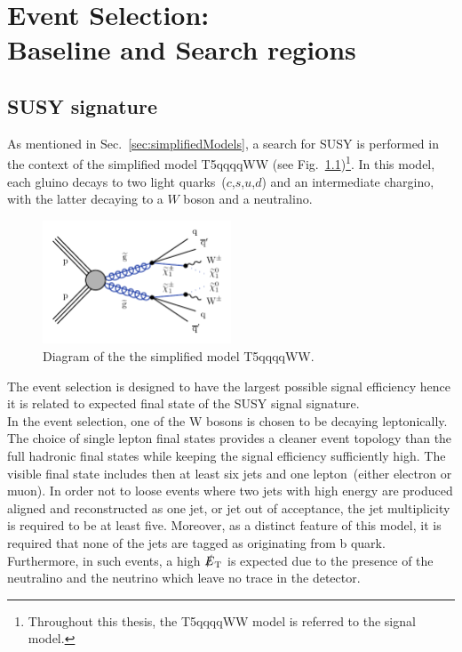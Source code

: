\chapter{Event Selection:\\Baseline and Search regions}
\label{Chap:eventSel}
\section{SUSY signature}
\label{signalDef}
As mentioned in Sec.~\ref{sec:simplifiedModels}, a search for SUSY is performed in the context of the simplified model T5qqqqWW (see Fig.~\ref{fig:T5qqqqWW})\footnote{Throughout this thesis, the T5qqqqWW model is referred to the signal model.}. In this model, each gluino decays to two light quarks~($c$,$s$,$u$,$d$) and an intermediate chargino, with the latter decaying to a $W$ boson and a neutralino.\\
\begin{figure}[!hb]
  \includegraphics[width=0.5\textwidth]{Plots/feyndiagrams/T5qqqqWW.pdf}
\centering
  \caption{\label{fig:T5qqqqWW} Diagram of the the simplified model T5qqqqWW. 
  }
\end{figure}
The event selection is designed to have the largest possible signal efficiency hence it is related to expected final state of the SUSY signal signature.\\
In the event selection, one of the W bosons is chosen to be decaying leptonically. The choice of single lepton final states provides a cleaner event topology than the full hadronic final states while keeping the signal efficiency sufficiently high. The visible final state includes then at least six jets and one lepton~(either electron or muon). In order not to loose events where two jets with high energy are produced aligned and reconstructed as one jet, or jet out of acceptance, the jet multiplicity is required to be at least five. Moreover, as a distinct feature of this model, it is required that none of the jets are tagged as originating from b quark. Furthermore, in such events, a high $\slashed{E}_{\rm T}$ is expected due to the presence of the neutralino and the neutrino which leave no trace in the detector.\\ 
